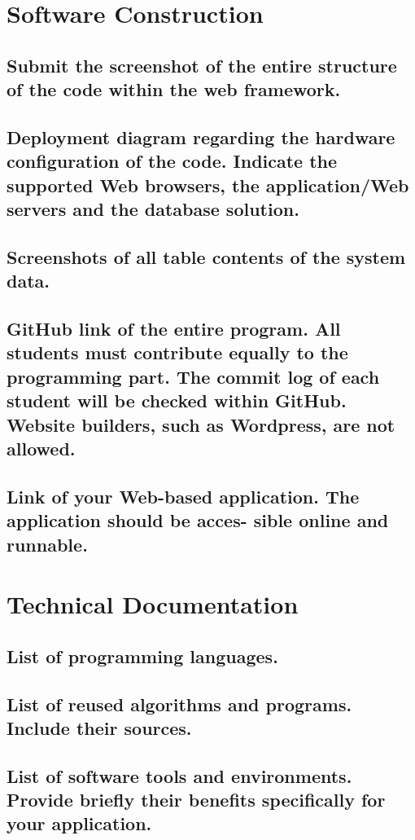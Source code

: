 \documentclass[letterpaper, 12 pt, conference]{ieeeconf}
\begin{document}
\section{Software Construction}
\subsection{Submit the screenshot of the entire structure of the code within the web framework.}
\subsection{Deployment diagram regarding the hardware configuration of the code. Indicate the supported Web browsers, the application/Web servers and the database solution.}
\subsection{Screenshots of all table contents of the system data.}
\subsection{GitHub link of the entire program. All students must contribute equally to the programming part. The commit log of each student will be checked within GitHub. Website builders, such as Wordpress, are not allowed.}
\subsection{Link of your Web-based application. The application should be acces- sible online and runnable.}

\section{Technical Documentation}
\subsection{List of programming languages.}
\subsection{List of reused algorithms and programs. Include their sources.}
\subsection{List of software tools and environments. Provide briefly their benefits specifically for your application.}
\end{document}

